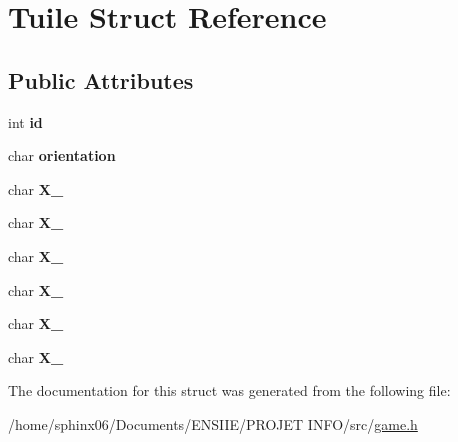 \hypertarget{structTuile}{}\section{Tuile Struct Reference}
\label{structTuile}
\subsection*{Public Attributes}
\begin{DoxyCompactItemize}
\item 
\mbox{\label{structTuile_a45754810cef2273dd533138572fd69d3}} 
int {\bfseries id}
\item 
\mbox{\label{structTuile_a35df68a87931e7230087f43452f2636b}} 
char {\bfseries orientation}
\item 
\mbox{\label{structTuile_a33d2a0d532346421afa9a2a90c254a0c}} 
char {\bfseries X\+\_}
\item 
\mbox{\label{structTuile_a41e9a4c908d5ee5ab73c41d1d80901bd}} 
char {\bfseries X\+\_}
\item 
\mbox{\label{structTuile_a3e98f6d39d1b6a2a058e49ee1b834d30}} 
char {\bfseries X\+\_}
\item 
\mbox{\label{structTuile_ac4a02540c448a7162c9c079ae89a9f44}} 
char {\bfseries X\+\_}
\item 
\mbox{\label{structTuile_a000249e10ae9e530221a112bd64c923c}} 
char {\bfseries X\+\_}
\item 
\mbox{\label{structTuile_aefe1f935f40ff71bb9d2c0effd46e1a7}} 
char {\bfseries X\+\_}
\end{DoxyCompactItemize}


The documentation for this struct was generated from the following file\+:\begin{DoxyCompactItemize}
\item 
/home/sphinx06/\+Documents/\+E\+N\+S\+I\+I\+E/\+P\+R\+O\+J\+E\+T I\+N\+F\+O/src/\hyperlink{game_8h}{game.\+h}\end{DoxyCompactItemize}
